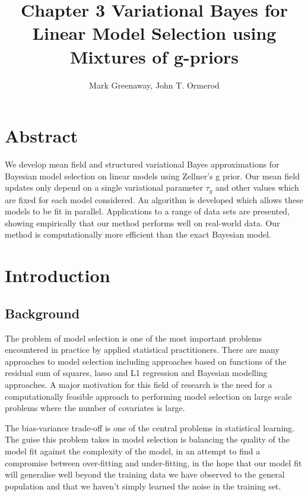 \documentclass{amsart}[12pt]
\title{Chapter 3 Variational Bayes for Linear Model Selection using Mixtures of g-priors}
\author{Mark Greenaway, John T. Ormerod}
\begin{document}
\maketitle

\section*{Abstract}


We develop mean field and structured variational Bayes approximations for Bayesian model selection on linear
models using Zellner's g prior. Our mean field updates only depend on a single variational parameter $\tau_g$
and other values which are fixed for each model considered. An algorithm is developed which allows these
models to be fit in parallel. Applications to a range of data sets are presented, showing  empirically that
our method performs well on real-world data. Our method is computationally more efficient  than the exact
Bayesian model.

\section{Introduction}

\subsection{Background}


The problem of model selection is one of the most important problems encountered in practice by applied
statistical practitioners. There are many approaches to model selection including approaches based on
functions of the residual sum of squares, lasso and L1 regression and Bayesian modelling approaches. A major
motivation for this field of research is the need for a computationally feasible approach to performing model
selection on large scale problems where the number of covariates is large.

The bias-variance trade-off is one of the central problems in statistical learning. The guise this problem
takes in model selection is balancing the quality of the model fit against the complexity of the model, in an
attempt to find a compromise between over-fitting and under-fitting, in the hope that our model fit will
generalise well beyond the training data we have observed to the general population and that we haven't simply
learned the noise in the training set.
\end{document}
